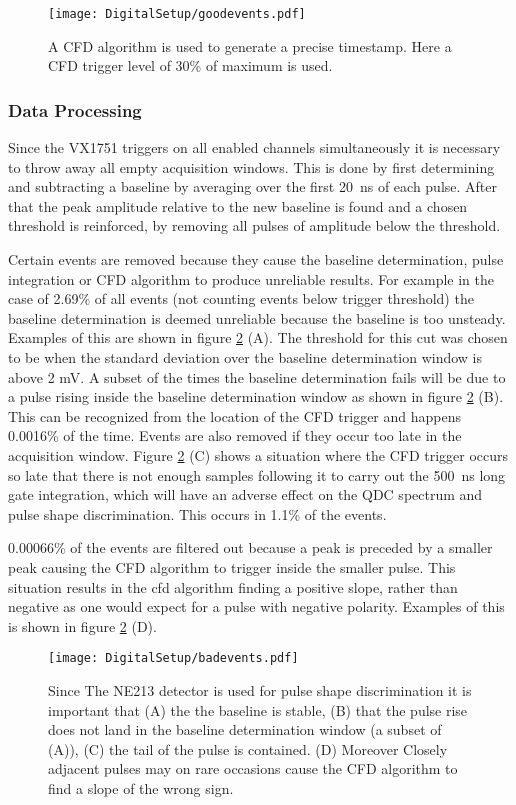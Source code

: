 \documentclass[main.tex]{subfiles}
\begin{document}
\begin{figure}[ht!]
    \centering
        \texttt{[image: DigitalSetup/goodevents.pdf]}
        \caption{A CFD algorithm is used to generate a precise timestamp. Here a CFD trigger level of 30\% of maximum is used.}
    \label{fig:cfd_trig} 
\end{figure}

\subsubsection{Data Processing}
Since the VX1751 triggers on all enabled channels simultaneously it is necessary to throw away all empty acquisition windows. This is done by first determining and subtracting a baseline by averaging over the first \si{20\nano\second} of each pulse. After that the peak amplitude relative to the new baseline is found and a chosen threshold is reinforced, by removing all pulses of amplitude below the threshold.

Certain events are removed because they cause the baseline determination, pulse integration or CFD algorithm to produce unreliable results. For example in the case of 2.69\% of all events (not counting events below trigger threshold) the baseline determination is deemed unreliable because the baseline is too unsteady. 
Examples of this are shown in figure \ref{fig:badevents} (A). The threshold for this cut was chosen to be when the standard deviation over the baseline determination window is above 2 mV. 
A subset of the times the baseline determination fails will be due to a pulse rising inside the baseline determination window as shown in figure \ref{fig:badevents} (B). This can be recognized from the location of the CFD trigger and happens 0.0016\% of the time. Events are also removed if they occur too late in the acquisition window. Figure \ref{fig:badevents} (C) shows a situation where the CFD trigger occurs so late that there is not enough samples following it to carry out the \si{500 \nano\second} long gate integration, which will have an adverse effect on the QDC spectrum and pulse shape discrimination. This occurs in 1.1\% of the events.

0.00066\% of the events are filtered out because a peak is preceded by a smaller peak causing the CFD algorithm to trigger inside the smaller pulse. This situation results in the cfd algorithm finding a positive slope, rather than negative as one would expect for a pulse with negative polarity. Examples of this is shown in figure \ref{fig:badevents} (D).
\begin{figure}[ht!]
    \centering
        \texttt{[image: DigitalSetup/badevents.pdf]}
        \caption{Since The NE213 detector is used for pulse shape discrimination it is important that (A) the the baseline is stable, (B) that the pulse rise does not land in the baseline determination window (a subset of (A)), (C) the tail of the pulse is contained. (D) Moreover Closely adjacent pulses may on rare occasions cause the CFD algorithm to find a slope of the wrong sign.}
    \label{fig:badevents} 
\end{figure}
\end{document}
